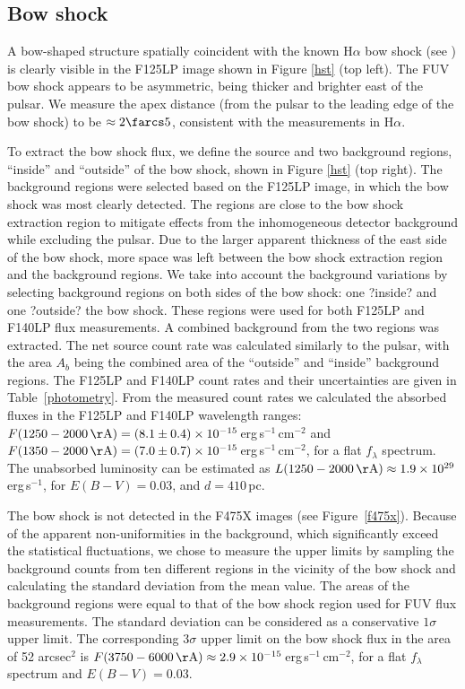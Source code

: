 \documentclass[iop]{emulateapj}
\begin{document}
\subsection{Bow shock}

A bow-shaped structure spatially coincident with the known H$\alpha$ bow shock (see \citealt{2002ApJ...580L.137G,2014ApJ...784..154B}) is clearly visible in the F125LP image shown in Figure \ref{hst} (top left).  The FUV  bow shock appears to be asymmetric,  being thicker and brighter east of the pulsar. We measure the apex distance (from the pulsar to the leading edge of the bow shock) to be $\approx2\farcs5$, consistent with the  \citet{2014ApJ...784..154B,2002ApJ...580L.137G} measurements in H$\alpha$. 

To extract the bow shock flux, we define the source and two background regions, ``inside'' and ``outside'' of the bow shock,  shown in Figure \ref{hst} (top right). 
The background regions were selected based on the F125LP image, in which the bow shock was most clearly detected. The regions are close to the bow shock extraction region to mitigate effects from the inhomogeneous detector background while excluding the pulsar. Due to the larger apparent thickness of the east side of the bow shock, more space was left between the bow shock extraction region and the background regions. We take into account the background variations by selecting background regions on both sides of the bow shock:  one ?inside? and one ?outside? the bow shock.
These regions  were used for both F125LP and F140LP flux measurements. A combined background from the two regions was extracted. The net source count rate was calculated similarly to the pulsar, with the area $A_{b}$ being the combined area of the ``outside'' and ``inside'' background regions. The F125LP and F140LP count rates and their uncertainties are given in Table~\ref{photometry}. From the measured count rates we calculated the absorbed fluxes in the F125LP and F140LP wavelength ranges: $F(1250-2000\,{\rm \AA})= (8.1\pm 0.4) \times10^{-15}$\,erg\,s$^{-1}$\,cm$^{-2}$ and $F(1350-2000\,{\rm \AA})= (7.0\pm0.7) \times10^{-15}$\,erg\,s$^{-1}$\,cm$^{-2}$, for a flat $f_\lambda$ spectrum. The unabsorbed luminosity can be estimated as  $L(1250-2000\,{\rm \AA}) \approx 1.9 \times10^{29}$\,erg\,s$^{-1}$, for $E(B-V)=0.03$, and $d=410$\,pc.

The bow shock is not detected in the F475X images (see Figure~\ref{f475x}). Because of the apparent non-uniformities in the background, which significantly exceed the statistical fluctuations, we chose to measure the upper limits by sampling the background counts from ten different regions in the vicinity of the bow shock and calculating the standard deviation from the mean value. The areas of the background regions were equal to that of the bow shock region used for FUV flux measurements. The standard deviation can be considered as  a conservative $1\sigma$ upper limit. The corresponding $3\sigma$ upper limit on the bow shock flux in the area of 52 arcsec$^2$ is $F(3750-6000\,{\rm \AA})\approx 2.9\times10^{-15}$\,erg\,s$^{-1}$\,cm$^{-2}$, for a flat  $f_\lambda$ spectrum and $E(B-V)=0.03$.
\end{document}
